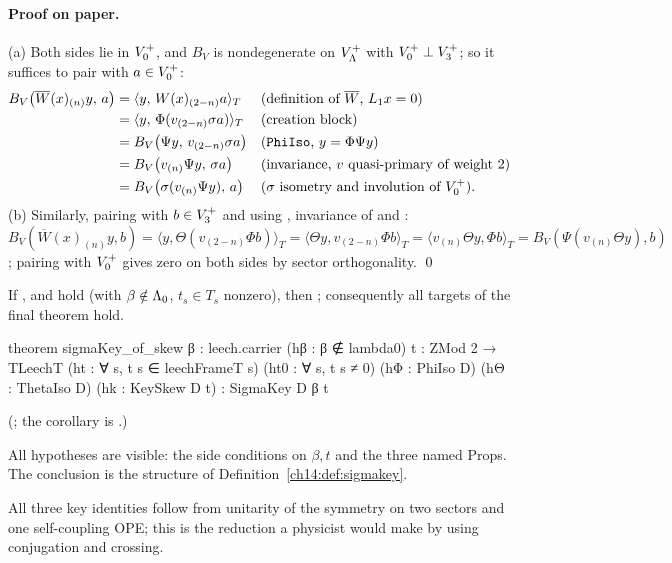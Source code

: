 \paragraph{Proof on paper.}  (a) Both sides lie in $V_0^{+}$, and $B_V$ is nondegenerate on $V_{\Lambda}^+$
with $V_0^{+}\perp V_3^{+}$; so it suffices to pair with $a\in V_0^{+}$:
\begin{align*}
B_V\bigl(\overline W(x)_{(n)}y,\,a\bigr)
 &=\langle y,\,W(x)_{(2-n)}a\rangle_T &&\text{(definition of }\overline W\text{, }L_1x=0)\\
 &=\langle y,\,\Phi(v_{(2-n)}\sigma a)\rangle_T &&\text{(creation block)}\\
 &=B_V\bigl(\Psi y,\,v_{(2-n)}\sigma a\bigr) &&\text{(\lean{PhiIso}, }y=\Phi\Psi y)\\
 &=B_V\bigl(v_{(n)}\Psi y,\,\sigma a\bigr) &&\text{(invariance, }v\text{ quasi-primary of weight 2)}\\
 &=B_V\bigl(\sigma(v_{(n)}\Psi y),\,a\bigr) &&(\sigma\text{ isometry and involution of }\chXIVA).
\end{align*}
(b) Similarly, pairing with $b\in V_3^{+}$ and using , invariance of  and
:
$B_V(\overline W(x)_{(n)}y,b)=\langle y,\Theta(v_{(2-n)}\Phi b)\rangle_T=\langle\Theta y,v_{(2-n)}\Phi b\rangle_T
=\langle v_{(n)}\Theta y,\Phi b\rangle_T=B_V(\Psi(v_{(n)}\Theta y),b)$; pairing with $V_0^{+}$ gives zero on both
sides by sector orthogonality. \qed

\begin{theorem}\label{ch14:thm:skew}
If ,  and  hold (with $\beta\notin{\Lambda}_0$, $t_s\in T_s$
nonzero), then ; consequently all targets of the final theorem hold.
\end{theorem}
\begin{leancode}
theorem sigmaKey_of_skew {β : leech.carrier} (hβ : β ∉ lambda0) {t : ZMod 2 → TLeechT}
    (ht : ∀ s, t s ∈ leechFrameT s) (ht0 : ∀ s, t s ≠ 0)
    (hΦ : PhiIso D) (hΘ : ThetaIso D) (hk : KeySkew D t) : SigmaKey D β t
\end{leancode}
(; the corollary is .)

\begin{dictionary}
All hypotheses are visible: the side conditions on $\beta,t$ and the three named Props.  The conclusion
is the structure of Definition~\ref{ch14:def:sigmakey}.
\end{dictionary}
\begin{physics}
All three key identities follow from unitarity of the symmetry on two sectors and one self-coupling OPE; this is the reduction a physicist would make by using conjugation and crossing.
\end{physics}


